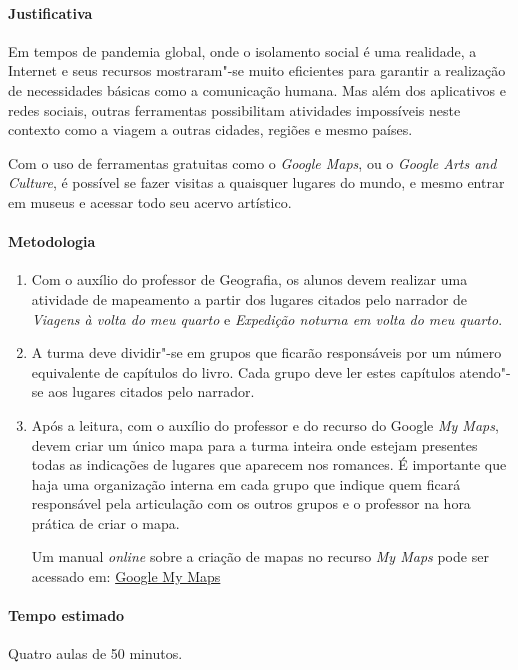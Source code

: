 \documentclass[12pt]{extarticle}
\begin{document}
\paragraph{Justificativa} Em tempos de pandemia global, onde o isolamento
social é uma realidade, a Internet e seus recursos mostraram"-se 
muito eficientes para garantir a realização de necessidades básicas
como a comunicação humana. Mas além dos aplicativos e redes sociais,
outras ferramentas possibilitam atividades impossíveis neste contexto
como a viagem a outras cidades, regiões e mesmo países. 

Com o uso de ferramentas gratuitas como o \emph{Google Maps},
ou o \emph{Google Arts and Culture}, é possível se fazer
visitas a quaisquer lugares do mundo, e mesmo entrar em museus e 
acessar todo seu acervo artístico.

\paragraph{Metodologia}
\begin{enumerate}
	\item
	Com o auxílio do professor de Geografia, os alunos devem realizar uma
	atividade de mapeamento a partir dos lugares citados pelo 
	narrador de \emph{Viagens à volta do meu quarto} e \emph{Expedição noturna em volta do meu quarto}.

	\item
	A turma deve dividir"-se em grupos que ficarão responsáveis por um número
	equivalente de capítulos do livro. Cada grupo deve ler estes capítulos
	atendo"-se aos lugares citados pelo narrador. 

	\item
	Após a leitura, com o auxílio do professor e do recurso do Google \emph{My Maps}, 
	devem criar um único mapa para a turma inteira onde estejam presentes
	todas as indicações de lugares que aparecem nos romances. É importante que haja
	uma organização interna em cada grupo que indique quem ficará responsável
	pela articulação com os outros grupos e o professor na hora prática de 
	criar o mapa.

	Um manual \emph{online} sobre a criação de mapas no recurso \emph{My Maps}
	pode ser acessado em: \href{https://support.google.com/mymaps/topic/3024924?hl=pt-BR}{Google My Maps}

\end{enumerate}

\paragraph{Tempo estimado} Quatro aulas de 50 minutos.
\end{document}
